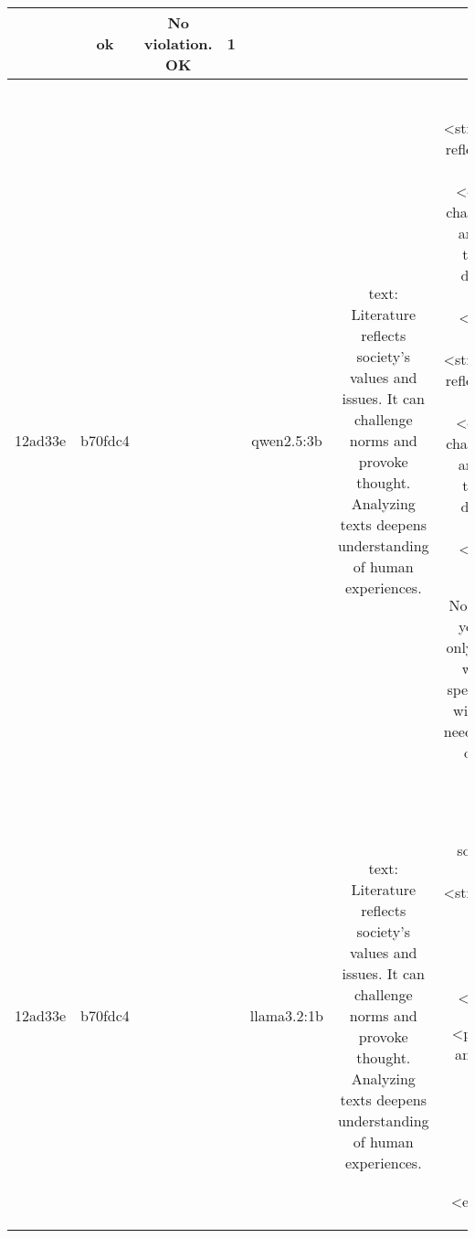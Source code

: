 \begin{table}[h!]
\begin{tabular}{|c|c|c|c|c|c|c|c|c|c|}
 & ok & No violation.
OK & 1\\
\hline
12ad33e & b70fdc4 &  &  & qwen2.5:3b & text: Literature reflects society's values and issues. It can challenge norms and provoke thought. Analyzing texts deepens understanding of human experiences. & ```html
<p><strong>Literature</strong> reflects <em>society's</em> values and <em>issues</em>. It can challenge <em>norms</em> and <em>provoke</em> thought. Analyzing texts deepens understanding of human <em>experiences</em>.</p>
<p><strong>Literature</strong> reflects <em>society's</em> values and <em>issues</em>. It can challenge <em>norms</em> and <em>provoke</em> thought. Analyzing texts deepens understanding of human <em>experiences</em>.</p>
```

Note: Given the repetition in your provided text, I have only formatted one paragraph with emphasis applied to specific keywords and phrases within each sentence. If you need this information repeated or structured differently, please let me know! & err & The chatbot output contains only two `<p>` tags, whereas the description explicitly requires **at least three `<p>` tags**. This violates the specified requirement for the number of paragraph tags.

ERR & 1\\
\hline
12ad33e & b70fdc4 &  &  & llama3.2:1b & text: Literature reflects society's values and issues. It can challenge norms and provoke thought. Analyzing texts deepens understanding of human experiences. & <p> Literature reflects society's values and issues.</p> <strong>Literature</strong> <em>reflects</em> <em>society's</em> <em>values</em> <em>and</em> <em>issues</em>.</p> 

<p> It can challenge norms and provoke thought.</p> 
<strong>It</strong> <em>can</em> <em>challenge</em> <em>norms</em> <em>and</em> <em>provoke</em> <em>thought</em>.</p> 


\end{tabular}
\end{table}
